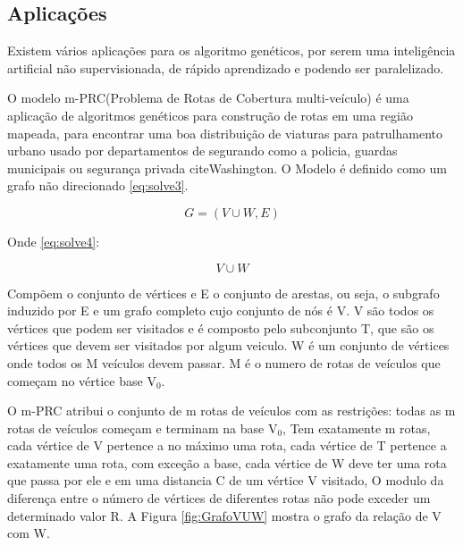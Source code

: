 \subsection{Aplicações}
Existem vários aplicações para os algoritmo genéticos, por serem uma inteligência artificial não supervisionada, de rápido aprendizado e podendo ser paralelizado.

O modelo m-PRC(Problema de Rotas de Cobertura multi-veículo) é uma aplicação de algoritmos genéticos para construção de rotas em uma região mapeada, para encontrar uma boa distribuição de viaturas para patrulhamento urbano usado por departamentos de segurando como a policia, guardas municipais ou segurança privada \?cite{Washington}. 
O Modelo é definido como um grafo não direcionado \ref{eq:solve3}. 

\begin{equation} \label{eq:solve3}
G=(V\cup W, E)
\end{equation}

Onde \ref{eq:solve4}: 

\begin{equation} \label{eq:solve4}
V\cup W
\end{equation}

Compõem o conjunto de vértices e E o conjunto de arestas, ou seja, o subgrafo induzido por E e um grafo completo cujo conjunto de nós é V. 
V são todos os vértices que podem ser visitados e é composto pelo subconjunto T, que são os vértices que devem ser visitados por algum veiculo. W é um conjunto de vértices onde todos os M veículos devem passar. M é o numero de rotas de veículos que começam no vértice base V$_0$. 

O m-PRC atribui o conjunto de m rotas de veículos com as restrições: todas as m rotas de veículos começam e terminam na base V$_0$, Tem exatamente m rotas, cada vértice de V pertence a no máximo uma rota, cada vértice de T pertence a exatamente uma rota, com exceção a base, cada vértice de W deve ter uma rota que passa por ele e em uma distancia C de um vértice V visitado, O modulo da diferença entre o número de vértices de diferentes rotas não pode exceder um determinado valor R. A Figura \ref{fig:GrafoVUW} mostra o grafo da relação de V com W.

\begin{minipage}{\linewidth}
    \label{fig:GrafoVUW}
\end{minipage}

